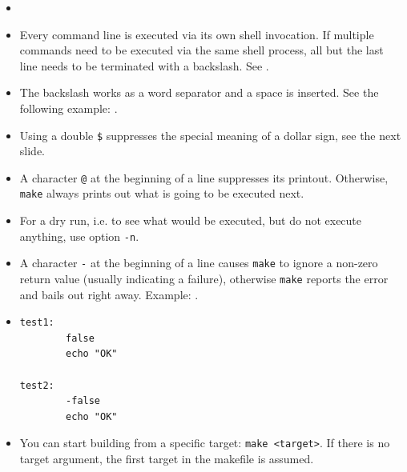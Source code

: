 \begin{itemize}
\item {}
\item Every command line is executed via its own shell invocation.  If
multiple commands need to be executed via the same shell process, all but the
last line needs to be terminated with a backslash.
See .
\item The backslash works as a word separator and a space is inserted.  See
the following example: .
\item Using a double \texttt{\$} suppresses the special meaning of a dollar
sign, see the next slide.
\item A character \texttt{@} at the beginning of a line suppresses its printout.
Otherwise, \texttt{make} always prints out what is going to be executed next.
\item For a dry run, i.e. to see what would be executed, but do not execute
anything, use option \texttt{-n}.
\item A character \texttt{-} at the beginning of a line causes \texttt{make} to
ignore a non-zero return value (usually indicating a failure), otherwise
\texttt{make} reports the error and bails out right away.  Example:
.
\item
\begin{verbatim}
test1:
        false
        echo "OK"

test2:
        -false
        echo "OK"
\end{verbatim}
\item You can start building from a specific target: \texttt{make <target>}.  If
there is no target argument, the first target in the makefile is assumed.
\end{itemize}



